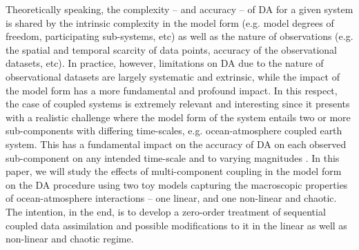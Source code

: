 \documentclass[a4paper,10pt]{article}
\begin{document}
\begin{multicols}{2}
Theoretically speaking, the complexity -- and accuracy -- of DA for a given system is shared by the intrinsic complexity in the model form (e.g. model degrees of freedom, participating sub-systems, etc) as well as the nature of observations (e.g. the spatial and temporal scarcity of data points, accuracy of the observational datasets, etc). In practice, however, limitations on DA due to the nature of observational datasets are largely systematic and extrinsic, while the impact of the model form has a more fundamental and profound impact. In this respect, the case of coupled systems is extremely relevant and interesting since it presents with a realistic challenge where the model form of the system entails two or more sub-components with differing time-scales, e.g. ocean-atmosphere coupled earth system. This has a fundamental impact on the accuracy of DA on each observed sub-component on any intended time-scale and to varying magnitudes \citep{tondeur2019, penny2019}. In this paper, we will study the effects of multi-component coupling in the model form on the DA procedure using two toy models capturing the macroscopic properties of ocean-atmosphere interactions -- one linear, and one non-linear and chaotic. The intention, in the end, is to develop a zero-order treatment of sequential coupled data assimilation and possible modifications to it in the linear as well as non-linear and chaotic regime.


\end{multicols}
\end{document}
